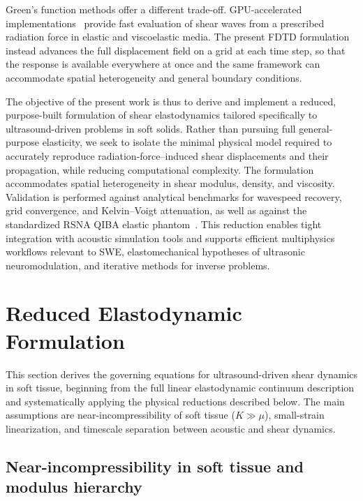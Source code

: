 \documentclass{iopjournal}
\begin{document}
Green's function methods offer a different trade-off. GPU-accelerated
implementations~\cite{yang2018gpu} provide fast evaluation of shear waves from
a prescribed radiation force in elastic and viscoelastic media. The present
FDTD formulation instead advances the full displacement field on a grid at each
time step, so that the response is available everywhere at once and the same
framework can accommodate spatial heterogeneity and general boundary conditions.

The objective of the present work is thus to derive and implement a reduced,
purpose-built formulation of shear elastodynamics tailored specifically to
ultrasound-driven problems in soft solids. Rather than pursuing full
general-purpose elasticity, we seek to isolate the minimal physical model
required to accurately reproduce radiation-force--induced shear displacements
and their propagation, while reducing computational complexity. The formulation
accommodates spatial heterogeneity in shear modulus, density, and viscosity.
Validation is performed against analytical benchmarks for wavespeed recovery,
grid convergence, and Kelvin--Voigt attenuation, as well as against the
standardized RSNA QIBA elastic phantom~\cite{palmeri2017fem}.
This reduction enables tight integration with acoustic simulation tools and
supports efficient multiphysics workflows relevant to SWE, elastomechanical
hypotheses of ultrasonic neuromodulation, and iterative methods for inverse
problems.


\section{Reduced Elastodynamic Formulation}
\label{sec:reduced_model}

This section derives the governing equations for ultrasound-driven shear
dynamics in soft tissue, beginning from the full linear elastodynamic continuum
description and systematically applying the physical reductions described
below. The main assumptions are near-incompressibility of soft tissue ($K \gg
\mu$), small-strain linearization, and timescale separation between acoustic
and shear dynamics.

\subsection{Near-incompressibility in soft tissue and modulus hierarchy}
\label{sec:near_incompressible}
\end{document}
